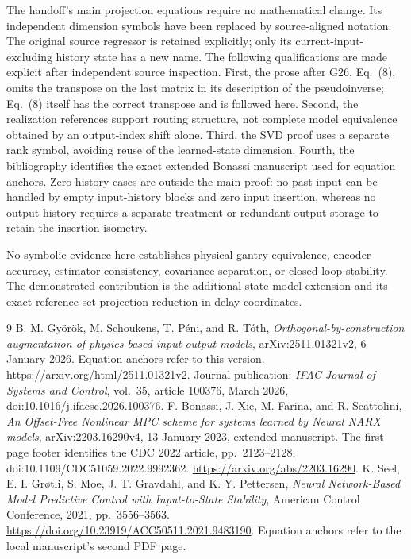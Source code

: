 \documentclass[11pt,a4paper]{article}
\begin{document}
The handoff's main projection equations require no mathematical change. Its independent dimension symbols have been replaced by source-aligned notation. The original source regressor is retained explicitly; only its current-input-excluding history state has a new name. The following qualifications are made explicit after independent source inspection. First, the prose after G26, Eq.\ (8), omits the transpose on the last matrix in its description of the pseudoinverse; Eq.\ (8) itself has the correct transpose and is followed here. Second, the realization references support routing structure, not complete model equivalence obtained by an output-index shift alone. Third, the SVD proof uses a separate rank symbol, avoiding reuse of the learned-state dimension. Fourth, the bibliography identifies the exact extended Bonassi manuscript used for equation anchors. Zero-history cases are outside the main proof: no past input can be handled by empty input-history blocks and zero input insertion, whereas no output history requires a separate treatment or redundant output storage to retain the insertion isometry.

No symbolic evidence here establishes physical gantry equivalence, encoder accuracy, estimator consistency, covariance separation, or closed-loop stability. The demonstrated contribution is the additional-state model extension and its exact reference-set projection reduction in delay coordinates.

\begin{thebibliography}{9}
 B. M. Gy\"or\"ok, M. Schoukens, T. P\'eni, and R. T\'oth,
\emph{Orthogonal-by-construction augmentation of physics-based input-output models},
arXiv:2511.01321v2, 6 January 2026. Equation anchors refer to this version.
\url{https://arxiv.org/html/2511.01321v2}.
Journal publication: \emph{IFAC Journal of Systems and Control}, vol.\ 35,
article 100376, March 2026, doi:10.1016/j.ifacsc.2026.100376.
 F. Bonassi, J. Xie, M. Farina, and R. Scattolini,
\emph{An Offset-Free Nonlinear MPC scheme for systems learned by Neural NARX models},
arXiv:2203.16290v4, 13 January 2023, extended manuscript.
The first-page footer identifies the CDC 2022 article, pp.\ 2123--2128,
doi:10.1109/CDC51059.2022.9992362.
\url{https://arxiv.org/abs/2203.16290}.
 K. Seel, E. I. Gr\o tli, S. Moe, J. T. Gravdahl, and K. Y. Pettersen,
\emph{Neural Network-Based Model Predictive Control with Input-to-State Stability},
American Control Conference, 2021, pp.\ 3556--3563.
\url{https://doi.org/10.23919/ACC50511.2021.9483190}.
Equation anchors refer to the local manuscript's second PDF page.
\end{thebibliography}
\end{document}
